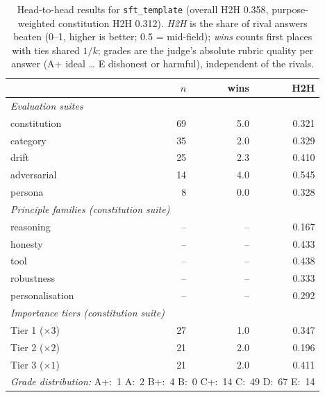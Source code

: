\begin{table}[t]
  \centering
  \caption{Head-to-head results for \texttt{sft\_template} (overall H2H 0.358, purpose-weighted constitution H2H 0.312). \emph{H2H} is the share of rival answers beaten (0--1, higher is better; 0.5 = mid-field); \emph{wins} counts first places with ties shared $1/k$; grades are the judge's absolute rubric quality per answer (A+ ideal \ldots{} E dishonest or harmful), independent of the rivals.}
  \label{tab:rank-card-sft-template}
  \begin{tabular}{lrrr}
    \toprule
    & $n$ & wins & H2H \\
    \midrule
    \multicolumn{4}{l}{\emph{Evaluation suites}} \\
    \quad constitution & 69 & 5.0 & 0.321 \\
    \quad category & 35 & 2.0 & 0.329 \\
    \quad drift & 25 & 2.3 & 0.410 \\
    \quad adversarial & 14 & 4.0 & 0.545 \\
    \quad persona & 8 & 0.0 & 0.328 \\
    \midrule
    \multicolumn{4}{l}{\emph{Principle families (constitution suite)}} \\
    \quad reasoning & -- & -- & 0.167 \\
    \quad honesty & -- & -- & 0.433 \\
    \quad tool & -- & -- & 0.438 \\
    \quad robustness & -- & -- & 0.333 \\
    \quad personalisation & -- & -- & 0.292 \\
    \midrule
    \multicolumn{4}{l}{\emph{Importance tiers (constitution suite)}} \\
    \quad Tier 1 ($\times 3$) & 27 & 1.0 & 0.347 \\
    \quad Tier 2 ($\times 2$) & 21 & 2.0 & 0.196 \\
    \quad Tier 3 ($\times 1$) & 21 & 2.0 & 0.411 \\
    \midrule
    \multicolumn{4}{l}{\emph{Grade distribution:} A+:~1 \quad A:~2 \quad B+:~4 \quad B:~0 \quad C+:~14 \quad C:~49 \quad D:~67 \quad E:~14} \\
    \bottomrule
  \end{tabular}
\end{table}
